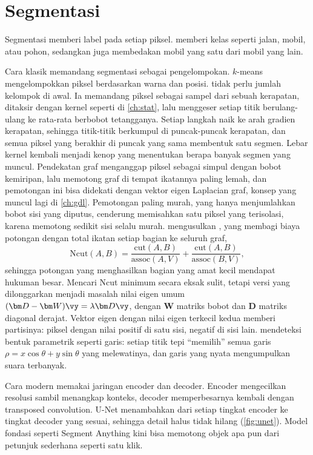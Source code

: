 \section{Segmentasi}

Segmentasi memberi label pada setiap piksel.  memberi kelas seperti
jalan, mobil, atau pohon, sedangkan  juga membedakan mobil yang satu
dari mobil yang lain.

Cara klasik memandang segmentasi sebagai pengelompokan. $k$-means \citep{lloyd1982}
mengelompokkan piksel berdasarkan warna dan posisi.  \citep{comaniciu2002} tidak perlu jumlah kelompok
di awal. Ia memandang piksel sebagai sampel dari sebuah kerapatan, ditaksir dengan kernel seperti di \cref{ch:stat}, lalu
menggeser setiap titik berulang-ulang ke rata-rata berbobot tetangganya. Setiap langkah naik ke arah gradien kerapatan, sehingga
titik-titik berkumpul di puncak-puncak kerapatan, dan semua piksel yang berakhir di puncak yang sama membentuk satu segmen. Lebar
kernel kembali menjadi kenop yang menentukan berapa banyak segmen yang muncul. Pendekatan graf menganggap piksel sebagai
simpul dengan bobot kemiripan, lalu memotong graf di tempat ikatannya paling lemah, dan
pemotongan ini bisa didekati dengan vektor eigen Laplacian graf, konsep yang muncul lagi di
\cref{ch:gdl}. Pemotongan paling murah, yang hanya menjumlahkan bobot sisi yang diputus, cenderung memisahkan
satu piksel yang terisolasi, karena memotong sedikit sisi selalu murah. \citet{shi2000} mengusulkan ,
yang membagi biaya potongan dengan total ikatan setiap bagian ke seluruh graf,
\begin{equation}
\mathrm{Ncut}(A,B)=\frac{\mathrm{cut}(A,B)}{\mathrm{assoc}(A,V)}+\frac{\mathrm{cut}(A,B)}{\mathrm{assoc}(B,V)},
\end{equation}
sehingga potongan yang menghasilkan bagian yang amat kecil mendapat hukuman besar. Mencari Ncut minimum secara eksak sulit,
tetapi versi yang dilonggarkan menjadi masalah nilai eigen umum $(\bm D-\bm W)\vy=\lambda\bm D\vy$, dengan $\bm W$ matriks bobot dan
$\bm D$ matriks diagonal derajat. Vektor eigen dengan nilai eigen terkecil kedua memberi partisinya: piksel dengan nilai positif di
satu sisi, negatif di sisi lain.  mendeteksi bentuk parametrik seperti garis: setiap titik
tepi ``memilih'' semua garis $\rho=x\cos\theta+y\sin\theta$ yang melewatinya, dan garis yang nyata
mengumpulkan suara terbanyak.

Cara modern memakai jaringan encoder dan decoder. Encoder mengecilkan resolusi sambil menangkap
konteks, decoder memperbesarnya kembali dengan transposed convolution. U-Net
\citep{ronneberger2015} menambahkan  dari setiap tingkat encoder ke tingkat
decoder yang sesuai, sehingga detail halus tidak hilang (\cref{fig:unet}). Model fondasi seperti
Segment Anything \citep{kirillov2023} kini bisa memotong objek apa pun dari petunjuk sederhana
seperti satu klik.

